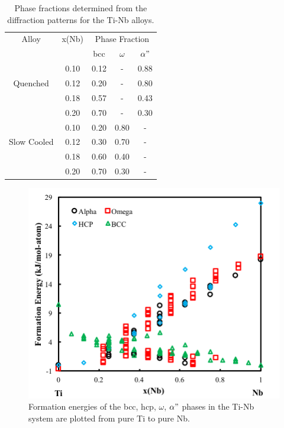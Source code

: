 \newpage
\begin{table}[H]
	\caption{Phase fractions determined from the diffraction patterns for the Ti-Nb alloys.}
	\centering
	\begin{tabular}{ c c c c c }
		\hline
		Alloy & x(Nb) & \multicolumn{3}{c}{Phase Fraction} \\
		&  & bcc & $\omega$ & $\alpha"$ \\
		\hline
		& 0.10 & 0.12 & - & 0.88 \\
		Quenched & 0.12 & 0.20 & - & 0.80 \\
		& 0.18 & 0.57 & - & 0.43 \\
		& 0.20 & 0.70 & - & 0.30 \\
		\hline
		& 0.10 & 0.20 & 0.80 & - \\
		Slow Cooled & 0.12 & 0.30 & 0.70 & - \\
		& 0.18 & 0.60 & 0.40 & - \\
		& 0.20 & 0.70 & 0.30 & - \\
		\hline
	\end{tabular}
	\label{Ch7-table:phasefrac}
\end{table}
\clearpage

\pagebreak
\begin{figure}[H]
	\centering
	\includegraphics[width=\textwidth]{Chapter-7/Figures/tinb0k.png}
	\caption{Formation energies of the bcc, hcp, $\omega$, $\alpha"$ phases in the Ti-Nb system are plotted from pure Ti to pure Nb.}
	\label{Ch7-figure:tinb0K}
\end{figure}

